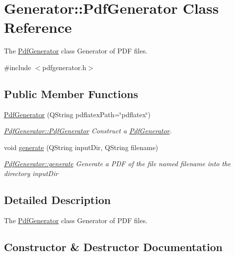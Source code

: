 \hypertarget{classGenerator_1_1PdfGenerator}{}\section{Generator\+:\+:Pdf\+Generator Class Reference}
\label{classGenerator_1_1PdfGenerator}


The \hyperlink{classGenerator_1_1PdfGenerator}{Pdf\+Generator} class Generator of P\+D\+F files.  




{\ttfamily \#include $<$pdfgenerator.\+h$>$}

\subsection*{Public Member Functions}
\begin{DoxyCompactItemize}
\item 
\hyperlink{classGenerator_1_1PdfGenerator_a59ca8292d423302478f7f278034f7006}{Pdf\+Generator} (Q\+String pdflatex\+Path=\char`\"{}pdflatex\char`\"{})
\begin{DoxyCompactList}\small\item\em \hyperlink{classGenerator_1_1PdfGenerator_a59ca8292d423302478f7f278034f7006}{Pdf\+Generator\+::\+Pdf\+Generator} Construct a \hyperlink{classGenerator_1_1PdfGenerator}{Pdf\+Generator}. \end{DoxyCompactList}\item 
void \hyperlink{classGenerator_1_1PdfGenerator_a2fcb924e15c201474e0071f81541b0ae}{generate} (Q\+String input\+Dir, Q\+String filename)
\begin{DoxyCompactList}\small\item\em \hyperlink{classGenerator_1_1PdfGenerator_a2fcb924e15c201474e0071f81541b0ae}{Pdf\+Generator\+::generate} Generate a P\+D\+F of the file named {\itshape filename} into the directory {\itshape input\+Dir} \end{DoxyCompactList}\end{DoxyCompactItemize}


\subsection{Detailed Description}
The \hyperlink{classGenerator_1_1PdfGenerator}{Pdf\+Generator} class Generator of P\+D\+F files. 

\subsection{Constructor \& Destructor Documentation}
\hypertarget{classGenerator_1_1PdfGenerator_a59ca8292d423302478f7f278034f7006}{}
